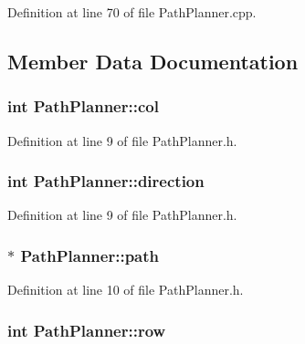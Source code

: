 Definition at line 70 of file Path\-Planner.\-cpp.



\subsection{Member Data Documentation}
\hypertarget{classPathPlanner_a20d2bf800c63aacfd1af314ad400d119}{
\subsubsection[{col}]{\setlength{\rightskip}{0pt plus 5cm}int Path\-Planner\-::col\hspace{0.3cm}{\ttfamily [private]}}}\label{classPathPlanner_a20d2bf800c63aacfd1af314ad400d119}


Definition at line 9 of file Path\-Planner.\-h.

\hypertarget{classPathPlanner_a1f9985b79ca49ca0b2992176a10a6210}{
\subsubsection[{direction}]{\setlength{\rightskip}{0pt plus 5cm}int Path\-Planner\-::direction\hspace{0.3cm}{\ttfamily [private]}}}\label{classPathPlanner_a1f9985b79ca49ca0b2992176a10a6210}


Definition at line 9 of file Path\-Planner.\-h.

\hypertarget{classPathPlanner_a9b41e5ee68a78a45e46003102a6c3b91}{
\subsubsection[{path}]{$\ast$ Path\-Planner\-::path\hspace{0.3cm}{\ttfamily [private]}}}\label{classPathPlanner_a9b41e5ee68a78a45e46003102a6c3b91}


Definition at line 10 of file Path\-Planner.\-h.

\hypertarget{classPathPlanner_a00b0fa8525a5fe9c8088ccaa005c4c54}{
\subsubsection[{row}]{\setlength{\rightskip}{0pt plus 5cm}int Path\-Planner\-::row\hspace{0.3cm}{\ttfamily [private]}}}\label{classPathPlanner_a00b0fa8525a5fe9c8088ccaa005c4c54}


